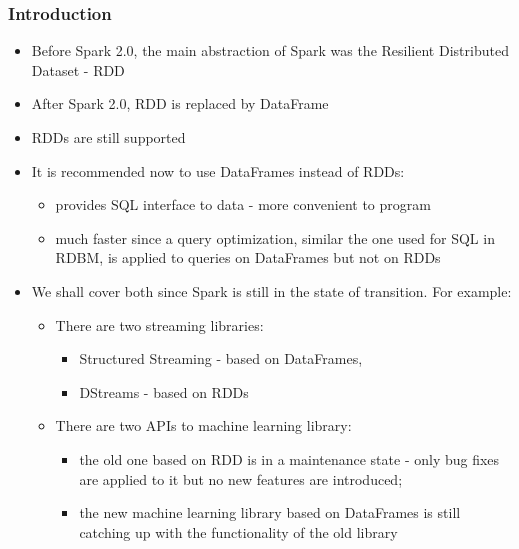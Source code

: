 \begin{frame}[fragile]
  \frametitle{Introduction}
  
\begin{itemize}
\item Before Spark 2.0, the main abstraction of Spark was the {\color{mycolordef}R}esilient {\color{mycolordef}D}istributed {\color{mycolordef}D}ataset  - {\color{mycolordef}RDD}
\item After Spark 2.0, RDD is replaced by {\color{mycolordef}DataFrame}
\item RDDs are still supported
\item It is recommended now to use {\color{mycolordef}DataFrames} instead of RDDs: 
  \begin{itemize}
  \item provides SQL interface to data - more convenient to program
  \item much faster since a query optimization, similar the one used for SQL in RDBM, is applied to queries on DataFrames but not on RDDs
  \end{itemize}
\item We shall cover both since Spark is still in the state of transition. For example:
  \begin{itemize}
    \item There are two streaming libraries: 
      \begin{itemize}
      \item {\color{mycolordef}Structured Streaming}  - based on DataFrames, 
      \item {\color{mycolordef}DStreams} - based on RDDs
      \end{itemize}
    \item There are two APIs to machine learning library: 
      \begin{itemize}
      \item the old one based on RDD is in a maintenance state - only bug fixes are applied to it but no new features are introduced; 
      \item the new machine learning library based on DataFrames is still catching up with the functionality of the old library
      \end{itemize}
  \end{itemize}
\end{itemize}

\end{frame}
